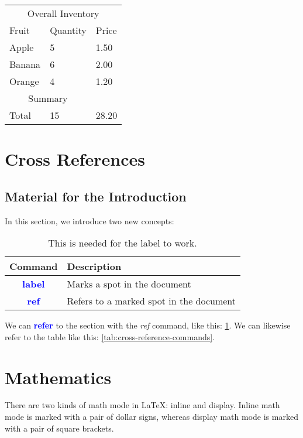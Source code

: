 \documentclass{article}
\newcommand{\kw}[1]{\textcolor{blue}{\textbf{#1}}}
\newcommand{\cmd}[1]{\textit{#1}}
\begin{document}
\begin{tabular}{*{3}{l}}
  \toprule
  \multicolumn{3}{c}{Overall Inventory} \\
  Fruit  & Quantity &  Price  \\
  \midrule
  Apple  & 5        &  1.50   \\
  Banana & 6        &  2.00   \\
  Orange & 4        &  1.20   \\
  \midrule
  \multicolumn{2}{c}{Summary} \\
  Total & 15        & 28.20   \\
  \bottomrule
\end{tabular}

\section{Cross References}
\label{sec:cross-references}

\subsection{Material for the Introduction}

In this section, we introduce two new concepts:

\begin{table}[ht] %
  \begin{tabular}{cp{9cm}}
     Command & Description \\
     \toprule
     \kw{label} & Marks a spot in the document \\
     \kw{ref} & Refers to a marked spot in the document \\
     \bottomrule
  \end{tabular}
  \caption{This is needed for the label to work.}
  \label{tab:cross-reference-command} %
\end{table}

We can \kw{refer} to the section with the \cmd{ref} command, like this: \ref{sec:cross-references}.
We can likewise refer to the table like this: \ref{tab:cross-reference-commands}.

\section{Mathematics}

There are two kinds of math mode in LaTeX: inline and display. Inline math mode is marked with
a pair of dollar signs, whereas display math mode is marked with a pair of square brackets.
\end{document}
